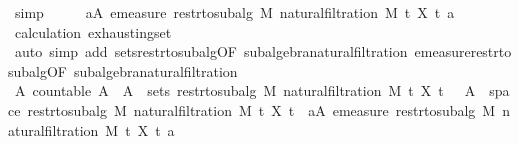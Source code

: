 \begin{isabellebody}
\ simp\isanewline
\ \ \isamarkupfalse%
\ \isamarkupfalse%
\ {\isachardoublequoteopen}{\isasymforall}a{\isasymin}A{\isachardot}{\kern0pt}\ emeasure\ {\isacharparenleft}{\kern0pt}restr{\isacharunderscore}{\kern0pt}to{\isacharunderscore}{\kern0pt}subalg\ M\ {\isacharparenleft}{\kern0pt}natural{\isacharunderscore}{\kern0pt}filtration\ M\ t\ X\ t\ a\ {\isasymnoteq}\ {\isasyminfinity}{\isachardoublequoteclose}\ \isamarkupfalse%
\ calculation{\isacharparenleft}{\kern0pt}{}{\isacharparenright}{\kern0pt}\ exhausting{\isacharunderscore}{\kern0pt}set{\isacharparenleft}{\kern0pt}{}{\isacharparenright}{\kern0pt}\ \isanewline
\ \ \ \ \isamarkupfalse%
\ {\isacharparenleft}{\kern0pt}auto\ simp\ add{\isacharcolon}{\kern0pt}\ sets{\isacharunderscore}{\kern0pt}restr{\isacharunderscore}{\kern0pt}to{\isacharunderscore}{\kern0pt}subalg{\isacharbrackleft}{\kern0pt}OF\ subalgebra{\isacharunderscore}{\kern0pt}natural{\isacharunderscore}{\kern0pt}filtration{\isacharbrackright}{\kern0pt}\ emeasure{\isacharunderscore}{\kern0pt}restr{\isacharunderscore}{\kern0pt}to{\isacharunderscore}{\kern0pt}subalg{\isacharbrackleft}{\kern0pt}OF\ subalgebra{\isacharunderscore}{\kern0pt}natural{\isacharunderscore}{\kern0pt}filtration{\isacharbrackright}{\kern0pt}{\isacharparenright}{\kern0pt}\isanewline
\ \ \isamarkupfalse%
\ \isamarkupfalse%
\ {\isachardoublequoteopen}{\isasymexists}A{\isachardot}{\kern0pt}\ countable\ A\ {\isasymand}\ A\ {\isasymsubseteq}\ sets\ {\isacharparenleft}{\kern0pt}restr{\isacharunderscore}{\kern0pt}to{\isacharunderscore}{\kern0pt}subalg\ M\ {\isacharparenleft}{\kern0pt}natural{\isacharunderscore}{\kern0pt}filtration\ M\ t\ X\ t\ {\isasymand}\ {\isasymUnion}\ A\ {\isacharequal}{\kern0pt}\ space\ {\isacharparenleft}{\kern0pt}restr{\isacharunderscore}{\kern0pt}to{\isacharunderscore}{\kern0pt}subalg\ M\ {\isacharparenleft}{\kern0pt}natural{\isacharunderscore}{\kern0pt}filtration\ M\ t\ X\ t\ {\isasymand}\ {\isacharparenleft}{\kern0pt}{\isasymforall}a{\isasymin}A{\isachardot}{\kern0pt}\ emeasure\ {\isacharparenleft}{\kern0pt}restr{\isacharunderscore}{\kern0pt}to{\isacharunderscore}{\kern0pt}subalg\ M\ {\isacharparenleft}{\kern0pt}natural{\isacharunderscore}{\kern0pt}filtration\ M\ t\ X\ t\ a\ {\isasymnoteq}\ {\isasyminfinity}{\isacharparenright}{\kern0pt}{\isachardoublequoteclose}\ \isamarkupfalse%

\end{isabellebody}
